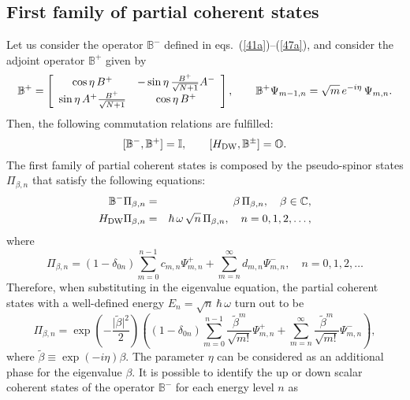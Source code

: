 \documentclass[aps,showpacs,showkeys]{revtex4}
\begin{document}
\subsection{First family of partial coherent states}\label{sec3.1}
Let us consider the operator $\mathbb{B}^-$ defined in eqs.~(\ref{41a})--(\ref{47a}), and consider the adjoint operator 
$\mathbb{B}^+$ given by
\begin{equation}\label{47}
 \mathbb{B}^+=\left[\begin{array}{c c}
\cos\eta\,B^+ & -\sin\eta\,\frac{B^+}{\sqrt{N+1}}A^- \\
\sin\eta\,A^+\frac{B^+}{\sqrt{N+1}} & \cos\eta\,B^+
\end{array}\right], \qquad \mathbb{B}^+\Psi_{m-1,n}=\sqrt{m}\,e^{-i\eta}\, \Psi_{m,n}.
\end{equation}
Then, the following commutation relations are fulfilled:
\begin{equation}\label{48}
[\mathbb{B}^-,\mathbb{B}^+]=\mathbb{I}, \qquad [H_{\rm DW},\mathbb{B}^\pm]=\mathbb{O}.
\end{equation}
The first family of partial coherent states is composed by the pseudo-spinor states $\Pi_{\beta,n}$  that  satisfy the following equations:
	\begin{eqnarray}
\mathbb{B}^- \Pi_{\beta,n}&=&\beta\, \Pi_{\beta,n}, \quad \beta\in\mathbb{C}, \label{49a} \\
H_{\rm DW} \Pi_{\beta,n}&=&\hbar\,\omega\,\sqrt{n}\,\Pi_{\beta,n}, \quad n=0,1,2,\dots, \label{49b}
\end{eqnarray}
where
\begin{equation}\label{50}
\Pi_{\beta,n}=(1-\delta_{0n})\sum_{m=0}^{n-1}c_{m,n}\Psi_{m,n}^{+}+\sum_{m=n}^{\infty}d_{m,n}\Psi_{m,n}^{-}, \quad n=0,1,2,\dots
\end{equation}
Therefore, when substituting in the eigenvalue equation, the partial coherent states with a well-defined energy $E_n=\sqrt{n}\,\hbar\,\omega$ turn out to be
\begin{equation}\label{51}
\Pi_{\beta,n}=\exp\left(-\frac{\vert\tilde{\beta}\vert^2}{2}\right)\left((1-\delta_{0n})\sum_{m=0}^{n-1}\frac{\tilde{\beta}^m}{\sqrt{m!}}\Psi_{m,n}^{+}+\sum_{m=n}^{\infty}\frac{\tilde{\beta}^m}{\sqrt{m!}}\Psi_{m,n}^{-}\right),
\end{equation}
where $\tilde{\beta}\equiv\exp\left(-i\eta\right)\beta$. The parameter $\eta$ can be considered as an additional phase for the eigenvalue $\beta$. It is possible to identify the up or down scalar coherent states of the operator $\mathbb{B}^- $ for each energy level $n$ as
\end{document}
